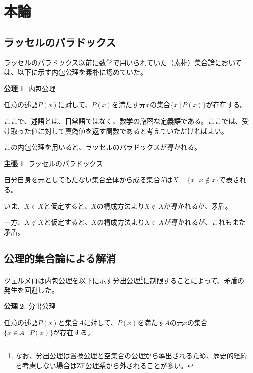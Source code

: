 \documentclass[10pt, a5paper, twoside]{jsarticle}
\theoremstyle{definition}
\newtheorem{clm}{主張}
\newtheorem{axm}{公理}
\begin{document}
	\section{本論}

		\subsection{ラッセルのパラドックス}

			ラッセルのパラドックス以前に数学で用いられていた（素朴）集合論においては、以下に示す内包公理を素朴に認めていた。

				\begin{axm}
					
					内包公理

					任意の述語$P(x)$に対して、$P(x)$を満たす元$x$の集合$ \{ x \ |\  P(x) \} $が存在する。

				\end{axm}

			ここで、述語とは、日常語ではなく、数学の厳密な定義語である。ここでは、受け取った値に対して真偽値を返す関数であると考えていただければよい。

			この内包公理を用いると、ラッセルのパラドックスが導かれる。

				\begin{clm}

					ラッセルのパラドックス

					自分自身を元としてもたない集合全体から成る集合$X$は$X = \{ x \ |\  x \notin x\} $で表される。

					いま、$X \in X$と仮定すると、$X$の構成方法より$X \notin X$が導かれるが、矛盾。

					一方、$X \notin X$と仮定すると、$X$の構成方法より$X \in X$が導かれるが、これもまた矛盾。
				
				\end{clm}

		\subsection{公理的集合論による解消}

			ツェルメロは内包公理を以下に示す分出公理\footnote{なお、分出公理は置換公理と空集合の公理から導出されるため、歴史的経緯を考慮しない場合はZF公理系から外されることが多い。}に制限することによって、矛盾の発生を回避した。

				\begin{axm}
					
					分出公理

					任意の述語$P(x)$と集合$A$に対して、$P(x)$を満たす$A$の元$x$の集合$ \{ x \in A \ |\  P(x) \} $が存在する。

				\end{axm}
\end{document}
